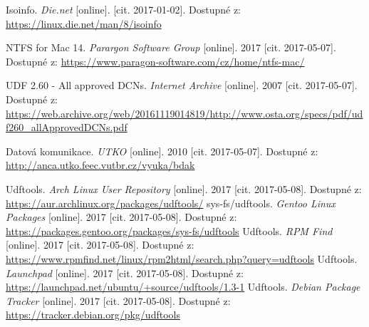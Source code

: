 \begin{literatura}{99}
    Isoinfo. \emph{Die.net} [online]. [cit. 2017-01-02]. Dostupné z: \url{https://linux.die.net/man/8/isoinfo}

    NTFS for Mac 14. \emph{Parargon Software Group} [online]. 2017 [cit. 2017-05-07]. Dostupné z: \url{https://www.paragon-software.com/cz/home/ntfs-mac/}

    UDF 2.60 - All approved DCNs. \emph{Internet Archive}\/ [online]. 2007 [cit. 2017-05-07]. Dostupné z: \url{https://web.archive.org/web/20161119014819/http://www.osta.org/specs/pdf/udf260_allApprovedDCNs.pdf}

    Datová komunikace. \emph{UTKO} [online]. 2010 [cit. 2017-05-07]. Dostupné z: \url{http://anca.utko.feec.vutbr.cz/vyuka/bdak}

    Udftools. \emph{Arch Linux User Repository} [online]. 2017 [cit. 2017-05-08]. Dostupné z: \url{https://aur.archlinux.org/packages/udftools/}
    sys-fs/udftools. \emph{Gentoo Linux Packages} [online]. 2017 [cit. 2017-05-08]. Dostupné z: \url{https://packages.gentoo.org/packages/sys-fs/udftools}
    Udftools. \emph{RPM Find} [online]. 2017 [cit. 2017-05-08]. Dostupné z: \url{https://www.rpmfind.net/linux/rpm2html/search.php?query=udftools}
    Udftools. \emph{Launchpad} [online]. 2017 [cit. 2017-05-08]. Dostupné z: \url{https://launchpad.net/ubuntu/+source/udftools/1.3-1}
    Udftools. \emph{Debian Package Tracker} [online]. 2017 [cit. 2017-05-08]. Dostupné z: \url{https://tracker.debian.org/pkg/udftools}


\end{literatura}


